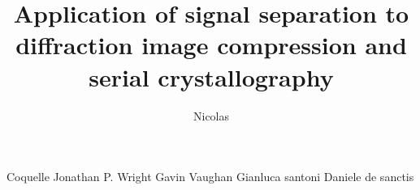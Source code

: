 \documentclass[preprint]{iucr}              %
\begin{document}



\title{Application of signal separation to diffraction image compression and serial crystallography}


\author[]{Nicolas}{Coquelle}
Jonathan P. Wright
Gavin Vaughan
Gianluca santoni
Daniele de sanctis









\end{document}
